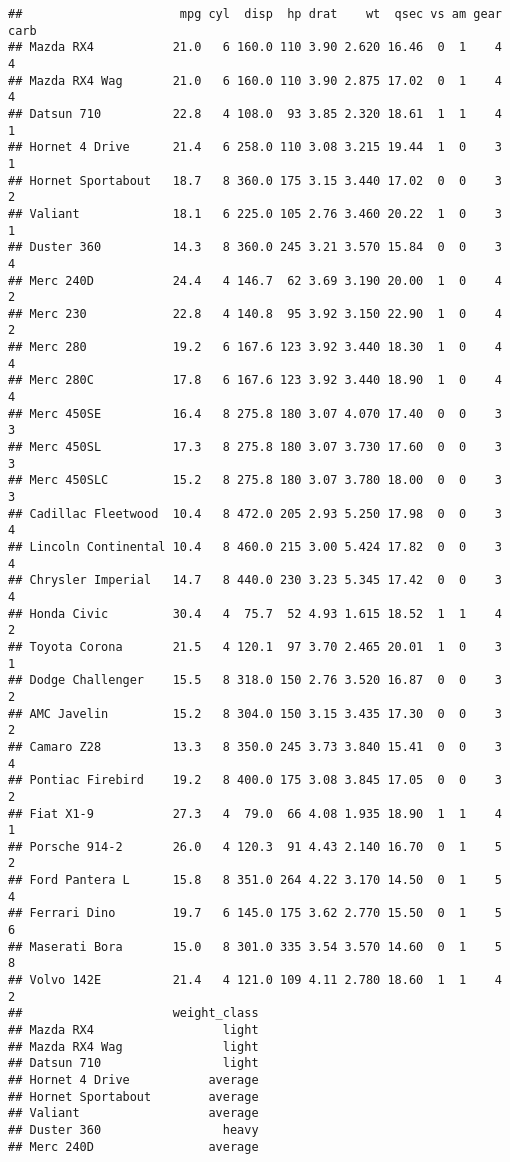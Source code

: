 \documentclass[]{article}
\begin{document}
\begin{verbatim}
##                      mpg cyl  disp  hp drat    wt  qsec vs am gear carb
## Mazda RX4           21.0   6 160.0 110 3.90 2.620 16.46  0  1    4    4
## Mazda RX4 Wag       21.0   6 160.0 110 3.90 2.875 17.02  0  1    4    4
## Datsun 710          22.8   4 108.0  93 3.85 2.320 18.61  1  1    4    1
## Hornet 4 Drive      21.4   6 258.0 110 3.08 3.215 19.44  1  0    3    1
## Hornet Sportabout   18.7   8 360.0 175 3.15 3.440 17.02  0  0    3    2
## Valiant             18.1   6 225.0 105 2.76 3.460 20.22  1  0    3    1
## Duster 360          14.3   8 360.0 245 3.21 3.570 15.84  0  0    3    4
## Merc 240D           24.4   4 146.7  62 3.69 3.190 20.00  1  0    4    2
## Merc 230            22.8   4 140.8  95 3.92 3.150 22.90  1  0    4    2
## Merc 280            19.2   6 167.6 123 3.92 3.440 18.30  1  0    4    4
## Merc 280C           17.8   6 167.6 123 3.92 3.440 18.90  1  0    4    4
## Merc 450SE          16.4   8 275.8 180 3.07 4.070 17.40  0  0    3    3
## Merc 450SL          17.3   8 275.8 180 3.07 3.730 17.60  0  0    3    3
## Merc 450SLC         15.2   8 275.8 180 3.07 3.780 18.00  0  0    3    3
## Cadillac Fleetwood  10.4   8 472.0 205 2.93 5.250 17.98  0  0    3    4
## Lincoln Continental 10.4   8 460.0 215 3.00 5.424 17.82  0  0    3    4
## Chrysler Imperial   14.7   8 440.0 230 3.23 5.345 17.42  0  0    3    4
## Honda Civic         30.4   4  75.7  52 4.93 1.615 18.52  1  1    4    2
## Toyota Corona       21.5   4 120.1  97 3.70 2.465 20.01  1  0    3    1
## Dodge Challenger    15.5   8 318.0 150 2.76 3.520 16.87  0  0    3    2
## AMC Javelin         15.2   8 304.0 150 3.15 3.435 17.30  0  0    3    2
## Camaro Z28          13.3   8 350.0 245 3.73 3.840 15.41  0  0    3    4
## Pontiac Firebird    19.2   8 400.0 175 3.08 3.845 17.05  0  0    3    2
## Fiat X1-9           27.3   4  79.0  66 4.08 1.935 18.90  1  1    4    1
## Porsche 914-2       26.0   4 120.3  91 4.43 2.140 16.70  0  1    5    2
## Ford Pantera L      15.8   8 351.0 264 4.22 3.170 14.50  0  1    5    4
## Ferrari Dino        19.7   6 145.0 175 3.62 2.770 15.50  0  1    5    6
## Maserati Bora       15.0   8 301.0 335 3.54 3.570 14.60  0  1    5    8
## Volvo 142E          21.4   4 121.0 109 4.11 2.780 18.60  1  1    4    2
##                     weight_class
## Mazda RX4                  light
## Mazda RX4 Wag              light
## Datsun 710                 light
## Hornet 4 Drive           average
## Hornet Sportabout        average
## Valiant                  average
## Duster 360                 heavy
## Merc 240D                average

\end{verbatim}
\end{document}

